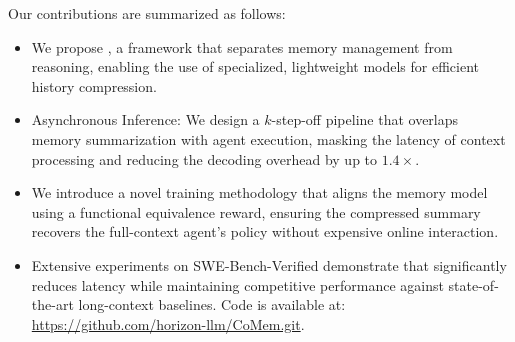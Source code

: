 Our contributions are summarized as follows:
\begin{itemize}
    \item We propose \model, a framework that separates memory management from reasoning, enabling the use of specialized, lightweight models for efficient history compression.
    \item Asynchronous Inference: We design a $k$-step-off pipeline that overlaps memory summarization with agent execution, masking the latency of context processing and reducing the decoding overhead by up to $1.4\times$.
    \item We introduce a novel training methodology that aligns the memory model using a functional equivalence reward, ensuring the compressed summary recovers the full-context agent's policy without expensive online interaction.
    \item Extensive experiments on SWE-Bench-Verified demonstrate that \model significantly reduces latency while maintaining competitive performance against state-of-the-art long-context baselines. Code is available at: \url{https://github.com/horizon-llm/CoMem.git}.
\end{itemize}